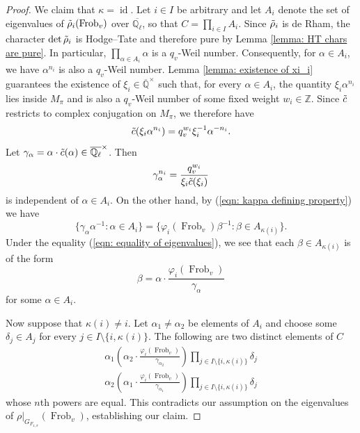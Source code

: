 \documentclass{amsart}
\theoremstyle{definition}
\numberwithin{equation}{section} %
\newcommand{\id}{\operatorname{id}}
\newcommand{\Qlbar}{\ensuremath{\overline{\mathbb{Q}_\ell}}}
\newcommand{\Frob}{\operatorname{Frob}}
\newcommand{\bb}[1]{\mathbb{#1}}
\newcommand{\ol}[1]{\overline{#1}}
\begin{document}
\begin{proof}
We claim that $\kappa = \id$.
Let $i \in I$ be arbitrary and let $A_i$ denote the set of eigenvalues of $\Tilde{\rho}_i(\Frob_v)$ over $\Qlbar$, so that $C = \prod_{i \in I} A_i$.
Since $\Tilde{\rho}_i$ is de Rham, the character $\det \Tilde{\rho}_i$ is Hodge--Tate and therefore pure by Lemma \ref{lemma: HT chars are pure}.
In particular, $\prod_{\alpha \in A_i} \alpha$ is a $q_v$-Weil number.
Consequently, for $\alpha \in A_i$, we have $\alpha^{n_i}$ is also a $q_v$-Weil number.
Lemma \ref{lemma: existence of xi_i} guarantees the existence of $\xi_i \in \ol{\bb{Q}}^\times$ such that, for every $\alpha \in A_i$, the quantity $\xi_i \alpha^{n_i}$ lies inside $M_\pi$ and is also a $q_v$-Weil number of some fixed weight $w_i \in \bb{Z}$.
Since $\Tilde{c}$ restricts to complex conjugation on $M_\pi$, we therefore have \[\Tilde{c}(\xi_i \alpha^{n_i}) = q_v^{w_i} \xi_i^{-1} \alpha^{-n_i}.\]
Let $\gamma_\alpha = \alpha \cdot \Tilde{c}(\alpha) \in \Qlbar^\times$.
Then \[\gamma_\alpha^{n_i} = \frac{q_v^{w_i}}{\xi_i \Tilde{c}(\xi_i)}\] is independent of $\alpha \in A_i$.
On the other hand, by (\ref{eqn: kappa defining property}) we have
\begin{equation} \label{eqn: equality of eigenvalues}
\{\gamma_\alpha \alpha^{-1}: \alpha \in A_i\} =  \{\varphi_i(\Frob_v) \beta^{-1} : \beta \in A_{\kappa(i)}\}.    
\end{equation}
Under the equality (\ref{eqn: equality of eigenvalues}), we see that each $\beta \in A_{\kappa(i)}$ is of the form 
\[
\beta = \alpha \cdot \frac{\varphi_i(\Frob_v)}{\gamma_{\alpha}}
\]
for some $\alpha \in A_i$.

Now suppose that $\kappa(i) \neq i$.
Let $\alpha_1 \neq \alpha_2$ be elements of $A_i$ and choose some $\delta_j \in A_j$ for every $j \in I \setminus \{i,\kappa(i)\}$.
The following are two distinct elements of $C$
\begin{align*}
\alpha_1 (\alpha_2 \cdot \frac{\varphi_i(\Frob_v)}{\gamma_{\alpha_2}})  \prod_{j \in I \setminus \{i,\kappa(i)\}} \delta_j   \\
\alpha_2 (\alpha_1 \cdot \frac{\varphi_i(\Frob_v)}{\gamma_{\alpha_1}})  \prod_{j \in I \setminus \{i,\kappa(i)\}} \delta_j
\end{align*}
whose $n$th powers are equal.
This contradicts our assumption on the eigenvalues of $\rho|_{G_{F_{1,\pi}}}(\Frob_v)$, establishing our claim.


\end{proof}
\end{document}
